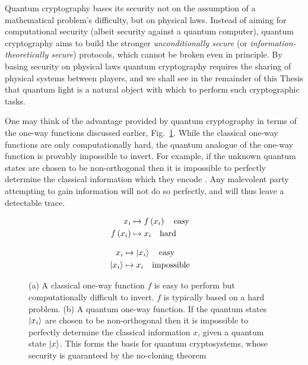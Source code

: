 Quantum cryptography bases its security not on the assumption of a mathematical problem's difficulty, but on physical laws. Instead of aiming for computational security (albeit security against a quantum computer), quantum cryptography aims to build the stronger \emph{unconditionally secure} (or \emph{information-theoretically secure}) protocols, which cannot be broken even in principle. By basing security on physical laws quantum cryptography requires the sharing of physical systems between players, and we shall see in the remainder of this Thesis that quantum light is a natural object with which to perform such cryptographic tasks. 

One may think of the advantage provided by quantum cryptography in terms of the one-way functions discussed earlier, Fig.~\ref{fig:qutrapdoor}. While the classical one-way functions are only computationally hard, the quantum analogue of the one-way function is provably impossible to invert. For example, if the unknown quantum states are chosen to be non-orthogonal then it is impossible to perfectly determine the classical information which they encode \cite{Nielsen2010, brendon_book}. Any malevolent party attempting to gain information will not do so perfectly, and will thus leave a detectable trace.

\begin{figure}[h!]
\centering
\captionsetup{width=\linewidth}
\begin{framed}
\begin{subfigure}{0.49\linewidth}
\begin{align*}
x_i &\mapsto f\left(x_i\right) \qq{easy} \\
f\left(x_i\right) &\mapsto x_i \qq{hard}
\end{align*}
\caption{}
\end{subfigure}
\begin{subfigure}{0.49\linewidth}
\begin{align*}
x_i &\mapsto \ket{x_i} \qq{easy}\\
\ket{x_i} &\mapsto x_i \qq{impossible}
\end{align*}
\caption{}
\end{subfigure}
\caption{(a) A classical one-way function $f$ is easy to perform but computationally difficult to invert. $f$ is typically based on a hard problem. (b) A quantum one-way function. If the quantum states $\ket{x_i}$ are chosen to be non-orthogonal then it is impossible to perfectly determine the classical information $x$, given a quantum state $\ket{x}$. This forms the basis for quantum cryptosystems, whose security is guaranteed by the no-cloning theorem \cite{Nielsen2010, brendon_book}}
\label{fig:qutrapdoor}
\end{framed}
\end{figure}








